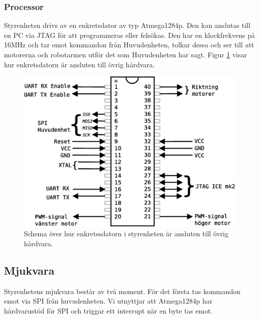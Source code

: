 
\subsubsection{Processor}
Styrenheten drivs av en enkretsdator av typ Atmega1284p. Den kan anslutas till en PC via JTAG för att programmeras eller felsökas. Den har en klockfrekvens på 16MHz och tar emot kommandon från Huvudenheten, tolkar dessa och ser till att motorerna och robotarmen utför det som Huvudenheten har sagt. Figur \ref{styr-processor} visar hur enkretsdatorn är ansluten till övrig hårdvara.

\begin{figure}[h!]
	\centering
	\includegraphics[scale=0.5]{grafik/styrenhet-processor}
	\caption{Schema över hur enkretssdatorn i styrenheten är ansluten till övrig hårdvara.} \label{styr-processor}
\end{figure}

\subsection{Mjukvara}
Styrenhetens mjukvara består av två moment. För det första tas kommandon emot via SPI från huvudenheten. Vi utnyttjar att Atmega1284p har hårdvarustöd för SPI och triggar ett interrupt när en byte tas emot.

